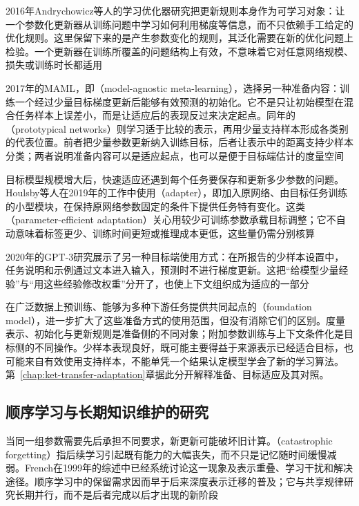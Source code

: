 2016年Andrychowicz等人的学习优化器研究把更新规则本身作为可学习对象：让一个参数化更新器从训练问题中学习如何利用梯度等信息，而不只依赖手工给定的优化规则。这里保留下来的是产生参数变化的规则，其泛化需要在新的优化问题上检验。一个更新器在训练所覆盖的问题结构上有效，不意味着它对任意网络规模、损失或训练时长都适用

2017年的MAML，即（model-agnostic meta-learning），选择另一种准备内容：训练一个经过少量目标梯度更新后能够有效预测的初始化。它不是只让初始模型在混合任务样本上误差小，而是让适应后的表现反过来决定起点。同年的（prototypical networks）则学习适于比较的表示，再用少量支持样本形成各类别的代表位置。前者把少量参数更新纳入训练目标，后者让表示中的距离支持少样本分类；两者说明准备内容可以是适应起点，也可以是便于目标端估计的度量空间

目标模型规模增大后，快速适应还遇到每个任务要保存和更新多少参数的问题。Houlsby等人在2019年的工作中使用（adapter），即加入原网络、由目标任务训练的小型模块，在保持原网络参数固定的条件下提供任务特有变化。这类（parameter-efficient adaptation）关心用较少可训练参数承载目标调整；它不自动意味着标签更少、训练时间更短或推理成本更低，这些量仍需分别核算

2020年的GPT-3研究展示了另一种目标端使用方式：在所报告的少样本设置中，任务说明和示例通过文本进入输入，预测时不进行梯度更新。这把“给模型少量经验”与“用这些经验修改权重”分开了，也使上下文组织成为适应的一部分

在广泛数据上预训练、能够为多种下游任务提供共同起点的（foundation model），进一步扩大了这些准备方式的使用范围，但没有消除它们的区别。度量表示、初始化与更新规则是准备侧的不同对象；附加参数训练与上下文条件化是目标侧的不同操作。少样本表现良好，既可能主要得益于来源表示已经适合目标，也可能来自有效使用支持样本，不能单凭一个结果认定模型学会了新的学习算法。第~\ref{chap:ket-transfer-adaptation}章据此分开解释准备、目标适应及其对照。

\subsection{顺序学习与长期知识维护的研究}
\label{sec:ket-overview-history-maintenance}

当同一组参数需要先后承担不同要求，新更新可能破坏旧计算。（catastrophic forgetting）指后续学习引起既有能力的大幅丧失，而不只是记忆随时间缓慢减弱。French在1999年的综述中已经系统讨论这一现象及表示重叠、学习干扰和解决途径。顺序学习中的保留需求因而早于后来深度表示迁移的普及；它与共享规律研究长期并行，而不是后者完成以后才出现的新阶段

